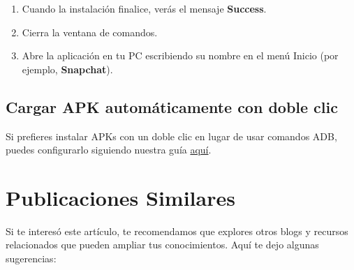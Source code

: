 \documentclass[
  doc,
  floatsintext,
  longtable,
  a4paper,
  nolmodern,
  notxfonts,
  notimes,
  12pt,
  colorlinks=true,linkcolor=blue,citecolor=blue,urlcolor=blue]{apa7}
\newenvironment{Shaded}{\begin{snugshade}}{\end{snugshade}}
\newcommand{\ExtensionTok}[1]{\textcolor[rgb]{0.00,0.23,0.31}{#1}}
\newcommand{\NormalTok}[1]{\textcolor[rgb]{0.00,0.23,0.31}{#1}}
\begin{document}
\begin{enumerate}
  \textbf{Ejemplo:}

\begin{Shaded}
\begin{Highlighting}[]
\ExtensionTok{adb.exe}\NormalTok{ install snapchat.apk}
\end{Highlighting}
\end{Shaded}
\item
  Cuando la instalación finalice, verás el mensaje \textbf{Success}.
\item
  Cierra la ventana de comandos.
\item
  Abre la aplicación en tu PC escribiendo su nombre en el menú Inicio
  (por ejemplo, \textbf{Snapchat}).
\end{enumerate}

\subsection{Cargar APK automáticamente con doble
clic}\label{cargar-apk-automuxe1ticamente-con-doble-clic}

Si prefieres instalar APKs con un doble clic en lugar de usar comandos
ADB, puedes configurarlo siguiendo nuestra guía \hyperref[]{aquí}.

\section{Publicaciones Similares}\label{publicaciones-similares}

Si te interesó este artículo, te recomendamos que explores otros blogs y
recursos relacionados que pueden ampliar tus conocimientos. Aquí te dejo
algunas sugerencias:
\end{document}
